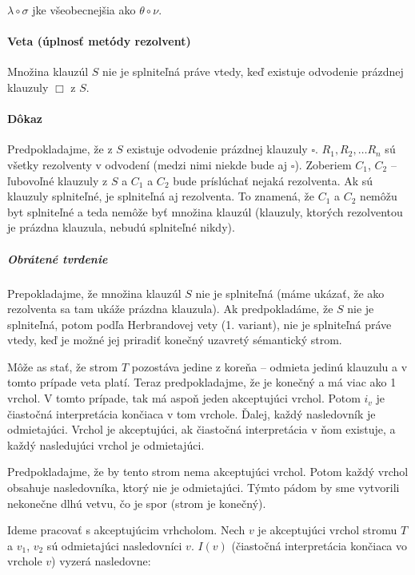$\lambda \circ \sigma$ jke všeobecnejšia ako $\theta \circ \nu$.


\paragraph{Veta (úplnosť metódy rezolvent)} Množina klauzúl $S$ nie je
splniteľná práve vtedy, keď existuje odvodenie prázdnej klauzuly $\Box$ z $S$.

\paragraph{Dôkaz} Predpokladajme, že z $S$ existuje odvodenie prázdnej klauzuly
$\square$. $R_1, R_2, \ldots R_n$ sú všetky rezolventy v odvodení (medzi nimi
niekde bude aj $\square$). Zoberiem $C_1$, $C_2$ -- ľubovoľné klauzuly z $S$ a
$C_1$ a $C_2$ bude príslúchať nejaká rezolventa. Ak sú klauzuly splniteľné, je
splniteľná aj rezolventa. To znamená, že $C_1$ a $C_2$ nemôžu byt splniteľné a
teda nemôže byť množina klauzúl (klauzuly, ktorých rezolventou je prázdna
klauzula, nebudú splniteľné nikdy). 

\subparagraph{Obrátené tvrdenie} Prepokladajme, že množina klauzúl $S$ nie je
splniteľná (máme ukázať, že ako rezolventa sa tam ukáže prázdna klauzula). Ak
predpokladáme, že $S$ nie je splniteľná, potom podľa Herbrandovej vety (1.
variant), nie je splniteľná práve vtedy, keď je možné jej priradiť konečný
uzavretý sémantický strom. 

\par Môže as stať, že strom $T$ pozostáva jedine z koreňa -- odmieta jedinú
klauzulu a v tomto prípade veta platí. Teraz predpokladajme, že je konečný a má
viac ako 1 vrchol. V tomto prípade, tak má aspoň jeden akceptujúci vrchol. Potom
$i_v$ je čiastočná interpretácia končiaca v tom vrchole. Ďalej, každý
nasledovník je odmietajúci. Vrchol je akceptujúci, ak čiastočná interpretácia v
ňom existuje, a každý nasledujúci vrchol je odmietajúci.

\par Predpokladajme, že by tento strom nema akceptujúci vrchol. Potom každý
vrchol obsahuje nasledovníka, ktorý nie je odmietajúci. Týmto pádom by sme
vytvorili nekonečne dlhú vetvu, čo je spor (strom je konečný).

\par Ideme pracovať s akceptujúcim vrhcholom. Nech $v$ je akceptujúci vrchol
stromu $T$ a $v_1$, $v_2$ sú odmietajúci nasledovníci $v$. $I(v)$ (čiastočná
interpretácia končiaca vo vrchole $v$) vyzerá nasledovne:

